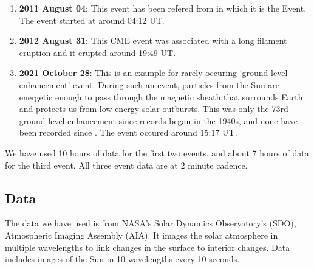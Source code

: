 \message{ !name(main.tex)}\documentclass[12pt]{article}
\begin{document}
\begin{enumerate}

        \item \textbf{2011 August 04}: This event has been refered from \citep{Mason2016} in which it is the  Event. The event started at around 04:12 UT.\\

        \item \textbf{2012 August 31}: This CME event was associated with a long filament eruption and it erupted around 19:49 UT.\\

        \item \textbf{2021 October 28}: This is an example for rarely occuring `ground level enhancement' event. During such an event, particles from the Sun are energetic enough to pass through the magnetic sheath that surrounds Earth and protects us from low energy solar outbursts. This was only the 73rd ground level enhancement since records began in the 1940s, and none have been recorded since \citep{Klein2022}. The event occured around 15:17 UT.\\

\end{enumerate}

We have used 10 hours of data for the first two events, and about 7 hours of data for the third event. All three event data are at 2 minute cadence.

\subsection{Data}

The data we have used is from NASA's Solar Dynamics Observatory's (SDO), Atmospheric Imaging Assembly (AIA). It images the solar atmosphere in multiple wavelengths to link changes in the surface to interior changes. Data includes images of the Sun in 10 wavelengths every 10 seconds.






\end{document}
